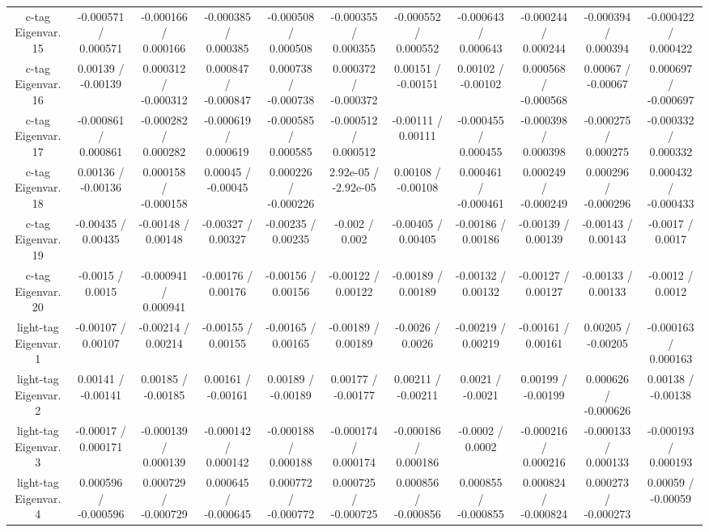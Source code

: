 \begin{table}[htbp]
\begin{center}
\begin{tabular}{|c|c|c|c|c|c|c|c|c|c|c|}
  c-tag Eigenvar. 15 & -0.000571 / 0.000571 & -0.000166 / 0.000166 & -0.000385 / 0.000385 & -0.000508 / 0.000508 & -0.000355 / 0.000355 & -0.000552 / 0.000552 & -0.000643 / 0.000643 & -0.000244 / 0.000244 & -0.000394 / 0.000394 & -0.000422 / 0.000422 \\ 
  c-tag Eigenvar. 16 & 0.00139 / -0.00139 & 0.000312 / -0.000312 & 0.000847 / -0.000847 & 0.000738 / -0.000738 & 0.000372 / -0.000372 & 0.00151 / -0.00151 & 0.00102 / -0.00102 & 0.000568 / -0.000568 & 0.00067 / -0.00067 & 0.000697 / -0.000697 \\ 
  c-tag Eigenvar. 17 & -0.000861 / 0.000861 & -0.000282 / 0.000282 & -0.000619 / 0.000619 & -0.000585 / 0.000585 & -0.000512 / 0.000512 & -0.00111 / 0.00111 & -0.000455 / 0.000455 & -0.000398 / 0.000398 & -0.000275 / 0.000275 & -0.000332 / 0.000332 \\ 
  c-tag Eigenvar. 18 & 0.00136 / -0.00136 & 0.000158 / -0.000158 & 0.00045 / -0.00045 & 0.000226 / -0.000226 & 2.92e-05 / -2.92e-05 & 0.00108 / -0.00108 & 0.000461 / -0.000461 & 0.000249 / -0.000249 & 0.000296 / -0.000296 & 0.000432 / -0.000433 \\ 
  c-tag Eigenvar. 19 & -0.00435 / 0.00435 & -0.00148 / 0.00148 & -0.00327 / 0.00327 & -0.00235 / 0.00235 & -0.002 / 0.002 & -0.00405 / 0.00405 & -0.00186 / 0.00186 & -0.00139 / 0.00139 & -0.00143 / 0.00143 & -0.0017 / 0.0017 \\ 
  c-tag Eigenvar. 20 & -0.0015 / 0.0015 & -0.000941 / 0.000941 & -0.00176 / 0.00176 & -0.00156 / 0.00156 & -0.00122 / 0.00122 & -0.00189 / 0.00189 & -0.00132 / 0.00132 & -0.00127 / 0.00127 & -0.00133 / 0.00133 & -0.0012 / 0.0012 \\ 
  light-tag Eigenvar. 1 & -0.00107 / 0.00107 & -0.00214 / 0.00214 & -0.00155 / 0.00155 & -0.00165 / 0.00165 & -0.00189 / 0.00189 & -0.0026 / 0.0026 & -0.00219 / 0.00219 & -0.00161 / 0.00161 & 0.00205 / -0.00205 & -0.000163 / 0.000163 \\ 
  light-tag Eigenvar. 2 & 0.00141 / -0.00141 & 0.00185 / -0.00185 & 0.00161 / -0.00161 & 0.00189 / -0.00189 & 0.00177 / -0.00177 & 0.00211 / -0.00211 & 0.0021 / -0.0021 & 0.00199 / -0.00199 & 0.000626 / -0.000626 & 0.00138 / -0.00138 \\ 
  light-tag Eigenvar. 3 & -0.00017 / 0.000171 & -0.000139 / 0.000139 & -0.000142 / 0.000142 & -0.000188 / 0.000188 & -0.000174 / 0.000174 & -0.000186 / 0.000186 & -0.0002 / 0.0002 & -0.000216 / 0.000216 & -0.000133 / 0.000133 & -0.000193 / 0.000193 \\ 
  light-tag Eigenvar. 4 & 0.000596 / -0.000596 & 0.000729 / -0.000729 & 0.000645 / -0.000645 & 0.000772 / -0.000772 & 0.000725 / -0.000725 & 0.000856 / -0.000856 & 0.000855 / -0.000855 & 0.000824 / -0.000824 & 0.000273 / -0.000273 & 0.00059 / -0.00059 \\ 

\end{tabular}
\end{center}
\end{table}

